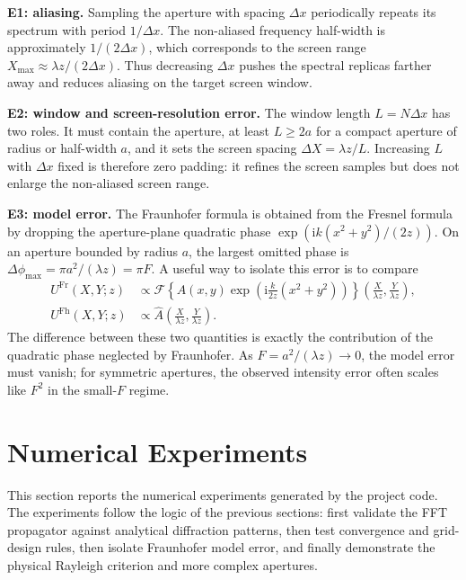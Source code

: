 \documentclass[12pt]{article}
\begin{document}
\textbf{E1: aliasing.} Sampling the aperture with spacing \(\Delta x\) periodically repeats its spectrum
with period \(1/\Delta x\). The non-aliased frequency half-width is approximately \(1/(2\Delta x)\), which
corresponds to the screen range \(X_{\max}\approx\lambda z/(2\Delta x)\). Thus decreasing \(\Delta x\)
pushes the spectral replicas farther away and reduces aliasing on the target screen window.

\textbf{E2: window and screen-resolution error.} The window length \(L=N\Delta x\) has two roles. It must
contain the aperture, at least \(L\geq 2a\) for a compact aperture of radius or half-width \(a\), and it
sets the screen spacing \(\Delta X=\lambda z/L\). Increasing \(L\) with \(\Delta x\) fixed is therefore
zero padding: it refines the screen samples but does not enlarge the non-aliased screen range.

\textbf{E3: model error.} The Fraunhofer formula is obtained from the Fresnel formula by dropping the
aperture-plane quadratic phase \(\exp(\mathrm{i}k(x^2+y^2)/(2z))\). On an aperture bounded by radius \(a\),
the largest omitted phase is \(\Delta\phi_{\max}=\pi a^2/(\lambda z)=\pi F\). A useful way to isolate this
error is to compare
\[
\begin{aligned}
    U^{\mathrm{Fr}}(X,Y;z)
    &\propto
    \mathcal{F}\!\left\{
        A(x,y)\exp\!\left(\mathrm{i}\frac{k}{2z}(x^2+y^2)\right)
    \right\}\left(\frac{X}{\lambda z},\frac{Y}{\lambda z}\right),\\
    U^{\mathrm{Fh}}(X,Y;z)
    &\propto
    \hat{A}\left(\frac{X}{\lambda z},\frac{Y}{\lambda z}\right).
\end{aligned}
\]
The difference between these two quantities is exactly the contribution of the quadratic phase neglected by
Fraunhofer. As \(F=a^2/(\lambda z)\to0\), the model error must vanish; for symmetric apertures, the
observed intensity error often scales like \(F^2\) in the small-\(F\) regime.

\section{Numerical Experiments}

This section reports the numerical experiments generated by the project code. The experiments follow the
logic of the previous sections: first validate the FFT propagator against analytical diffraction patterns,
then test convergence and grid-design rules, then isolate Fraunhofer model error, and finally demonstrate
the physical Rayleigh criterion and more complex apertures.
\end{document}

